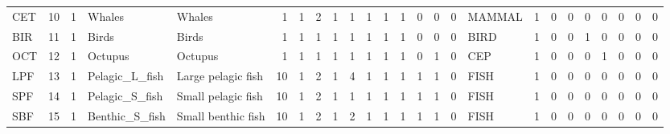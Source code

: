 \documentclass[11pt]{article}
\begin{document}
\begin{table}[htb]
\begin{center}
\begin{tabular}{lrrllrrrrrrrrrrrlrrrrrrrr}
 CET   &     10  &           1  &  Whales                &  Whales                &           1  &             1  &          2  &          1  &                1  &          1  &                1  &                  1  &         0  &           0  &      0  &  MAMMAL        &           1  &        0  &             0  &           0  &              0  &             0  &           0  &            0  \\
 BIR   &     11  &           1  &  Birds                 &  Birds                 &           1  &             1  &          1  &          1  &                1  &          1  &                1  &                  1  &         0  &           0  &      0  &  BIRD          &           1  &        0  &             0  &           1  &              0  &             0  &           0  &            0  \\
 OCT   &     12  &           1  &  Octupus               &  Octupus               &           1  &             1  &          1  &          1  &                1  &          1  &                1  &                  1  &         0  &           1  &      0  &  CEP           &           1  &        0  &             0  &           0  &              1  &             0  &           0  &            0  \\
 LPF   &     13  &           1  &  Pelagic_L_fish        &  Large pelagic fish    &          10  &             1  &          2  &          1  &                4  &          1  &                1  &                  1  &         1  &           1  &      0  &  FISH          &           1  &        0  &             0  &           0  &              0  &             0  &           0  &            0  \\
 SPF   &     14  &           1  &  Pelagic_S_fish        &  Small pelagic fish    &          10  &             1  &          2  &          1  &                1  &          1  &                1  &                  1  &         1  &           1  &      0  &  FISH          &           1  &        0  &             0  &           0  &              0  &             0  &           0  &            0  \\
 SBF   &     15  &           1  &  Benthic_S_fish        &  Small benthic fish    &          10  &             1  &          2  &          1  &                2  &          1  &                1  &                  1  &         1  &           1  &      0  &  FISH          &           1  &        0  &             0  &           0  &              0  &             0  &           0  &            0  \\

\end{tabular}
\end{center}
\end{table}
\end{document}
